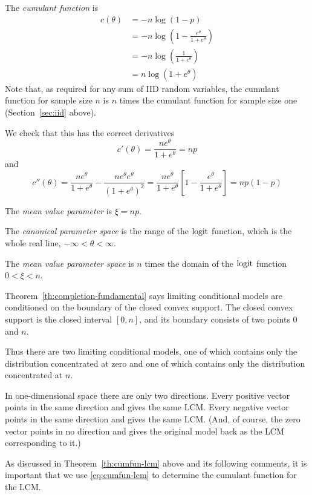 The \emph{cumulant function} is
\begin{align*}
   c(\theta)
   & =
   - n \log(1 - p)
   \\
   & =
   - n \log\left(1 - \frac{e^\theta}{1 + e^\theta}\right)
   \\
   & =
   - n \log\left(\frac{1}{1 + e^\theta}\right)
   \\
   & =
   n \log\left(1 + e^\theta\right)
\end{align*}
Note that, as required for any sum of IID random variables, the cumulant
function for sample size $n$ is $n$ times the cumulant function for
sample size one (Section~\ref{sec:iid} above).

We check that this has the correct derivatives
$$
   c'(\theta) = \frac{n e^\theta}{1 + e^\theta} = n p
$$
and
$$
   c''(\theta)
   =
   \frac{n e^\theta}{1 + e^\theta}
   - \frac{n e^\theta e^\theta}{(1 + e^\theta)^2}
   =
   \frac{n e^\theta}{1 + e^\theta}
   \left[ 1 - \frac{e^\theta}{1 + e^\theta} \right]
   =
   n p (1 - p)
$$

The \emph{mean value parameter} is $\xi = n p$.

The \emph{canonical parameter space} is the range of the $\operatorname{logit}$ function,
which is the whole real line, $- \infty < \theta < \infty$.

The \emph{mean value parameter space} is $n$ times the domain
of the $\operatorname{logit}$ function $0 < \xi < n$.

Theorem~\ref{th:completion-fundamental} says limiting conditional models
are conditioned on the boundary of the closed convex support.
The closed convex support is the closed interval $[0, n]$, and its
boundary consists of two points $0$ and $n$.

Thus there are two limiting conditional models, one of which contains only
the distribution concentrated at zero and one of which contains only
the distribution concentrated at $n$.

In one-dimensional space there are only two directions.  Every positive
vector points in the same direction and gives the same LCM.  Every negative
vector points in the same direction and gives the same LCM.  (And, of course,
the zero vector points in no direction and gives the original model back
as the LCM corresponding to it.)

As discussed in Theorem~\ref{th:cumfun-lcm} above and its following comments,
it is important that we use \eqref{eq:cumfun-lcm} to determine the cumulant
function for the LCM.

